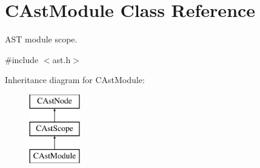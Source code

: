 \hypertarget{classCAstModule}{\section{C\-Ast\-Module Class Reference}
\label{classCAstModule}
}


A\-S\-T module scope.  




{\ttfamily \#include $<$ast.\-h$>$}

Inheritance diagram for C\-Ast\-Module\-:\begin{figure}[H]
\begin{center}
\leavevmode
\includegraphics[height=3.000000cm]{classCAstModule}
\end{center}
\end{figure}
